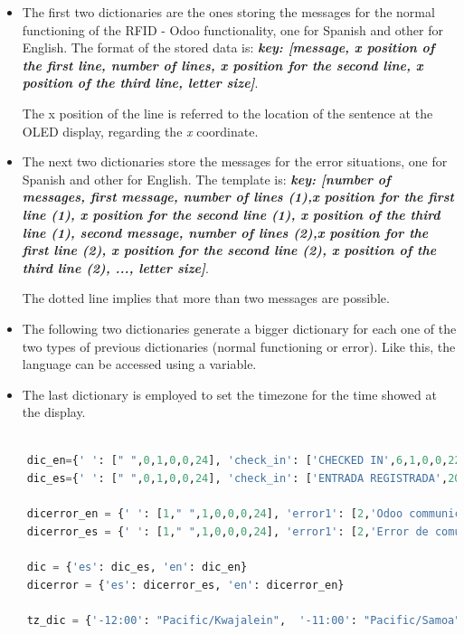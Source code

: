 \documentclass[12pt,a4paper,oneside]{article} %
\begin{document}
\begin{itemize}
	\item The first two dictionaries are the ones storing the messages for the normal functioning of the RFID - Odoo functionality, one for Spanish and other for English. The format of the stored data is: \emph{\textbf{key: [message, x position of the first line, number of lines, x position for the second line, x position of the third line, letter size]}}.
	
	The x position of the line is referred to the location of the sentence at the OLED display, regarding the \textit{x} coordinate.
	\item The next two dictionaries store the messages for the error situations, one for Spanish and other for English. The template is: \emph{\textbf{key: [number of messages, first message, number of lines (1),x position for the first line (1), x position for the second line (1), x position of the third line (1), second message, number of lines (2),x position for the first line (2), x position for the second line (2), x position of the third line (2), ...,  letter size]}}.
	
	The dotted line implies that more than two messages are possible.
	\item The following two dictionaries generate a bigger dictionary for each one of the two types of previous dictionaries (normal functioning or error). Like this, the language can be accessed using a variable.
	\item The last dictionary is employed to set the timezone for the time showed at the display.
\end{itemize}

\begin{lstlisting}[language=python]

	dic_en={' ': [" ",0,1,0,0,24], 'check_in': ['CHECKED IN',6,1,0,0,22],...}
	dic_es={' ': [" ",0,1,0,0,24], 'check_in': ['ENTRADA REGISTRADA',20,2,3,0,22],...}
	
	dicerror_en = {' ': [1," ",1,0,0,0,24], 'error1': [2,'Odoo communication failed',3,41,5,40,'Check the parameters',3,41,53,20,19],...}
	dicerror_es = {' ': [1," ",1,0,0,0,24], 'error1': [2,'Error de comunicacion',3,47,54,15,'Chequea los parametros',3,28,50,20,19],...}
	
	dic = {'es': dic_es, 'en': dic_en}
	dicerror = {'es': dicerror_es, 'en': dicerror_en}
	
	tz_dic = {'-12:00': "Pacific/Kwajalein",  '-11:00': "Pacific/Samoa",...}

\end{lstlisting}
\end{document}

